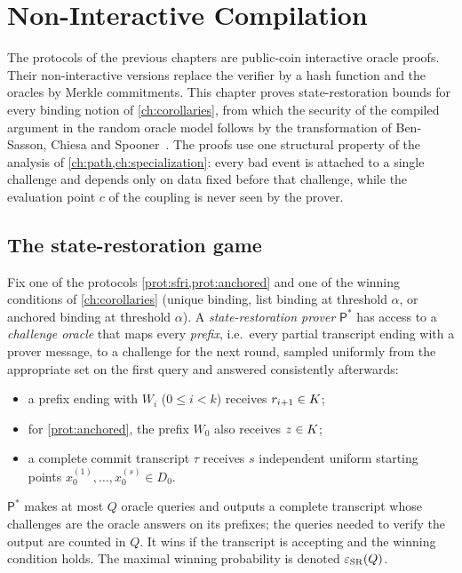 \chapter{Non-Interactive Compilation}
\label{ch:fs}

The protocols of the previous chapters are public-coin interactive oracle proofs. Their
non-interactive versions replace the verifier by a hash function and the oracles by
Merkle commitments. This chapter proves state-restoration bounds for every binding notion
of \cref{ch:corollaries}, from which the security of the compiled argument in the random
oracle model follows by the transformation of Ben-Sasson, Chiesa and Spooner~\cite{BCS16}.
The proofs use one structural property of the analysis of \cref{ch:path,ch:specialization}:
every bad event is attached to a single challenge and depends only on data fixed before
that challenge, while the evaluation point $c$ of the coupling is never seen by the
prover.

\section{The state-restoration game}

\begin{definition}\label{def:sr}
Fix one of the protocols \cref{prot:sfri,prot:anchored} and one of the winning conditions
of \cref{ch:corollaries} (unique binding, list binding at threshold $\alpha$, or anchored
binding at threshold $\alpha$). A \emph{state-restoration prover} $\mathsf P^\ast$ has
access to a \emph{challenge oracle} that maps every \emph{prefix}, i.e.\ every partial
transcript ending with a prover message, to a challenge for the next round, sampled
uniformly from the appropriate set on the first query and answered consistently
afterwards:
\begin{itemize}
\item a prefix ending with $W_i$ ($0\le i<k$) receives $r_{i+1}\in K$;
\item for \cref{prot:anchored}, the prefix $W_0$ also receives $z\in K$;
\item a complete commit transcript $\tau$ receives $s$ independent uniform starting points
$x_0^{(1)},\dots,x_0^{(s)}\in D_0$.
\end{itemize}
$\mathsf P^\ast$ makes at most $Q$ oracle queries and outputs a complete transcript whose
challenges are the oracle answers on its prefixes; the queries needed to verify the output
are counted in $Q$. It wins if the transcript is accepting and the winning condition holds.
The maximal winning probability is denoted $\varepsilon_{\mathrm{SR}}(Q)$.
\end{definition}


